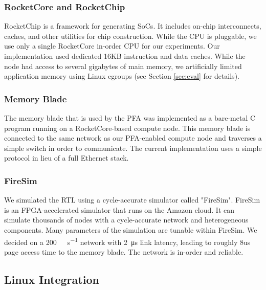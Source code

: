 \subsubsection{RocketCore and RocketChip}
RocketChip\cite{rocketchip} is a framework for generating SoCs. It includes
on-chip interconnects, caches, and other utilities for chip construction. While
the CPU is pluggable, we use only a single RocketCore in-order CPU for our
experiments. Our implementation used dedicated 16KB instruction and data
caches. While the node had access to several gigabytes of main memory, we
artificially limited application memory using Linux cgroups (see Section
\ref{sec:eval} for details).

\subsubsection{Memory Blade}
The memory blade that is used by the PFA was implemented as a bare-metal C
program running on a RocketCore-based compute node. This memory blade is
connected to the same network as our PFA-enabled compute node and traverses a
simple switch in order to communicate. The current implementation uses a simple
protocol in lieu of a full Ethernet stack. 

\subsubsection{FireSim}
We simulated the RTL using a cycle-accurate simulator called
"FireSim"\cite{firesim}. FireSim is an FPGA-accelerated simulator that runs on
the Amazon cloud. It can simulate thousands of nodes with a cycle-accurate
network and heterogeneous components.  Many parameters of the simulation are
tunable within FireSim. We decided on a \SI{200}{\giga\bit\per\second} network
with \SI{2}{\micro\second} link latency, leading to roughly 8us page access time
to the memory blade. The network is in-order and reliable. 

\subsection{Linux Integration} \label{sec:linuxImpl}
    
